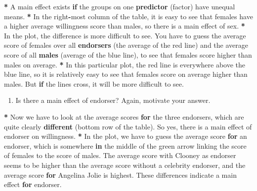 \documentclass[a4paper]{book}
\newenvironment{Shaded}{\begin{snugshade}}{\end{snugshade}}
\newcommand{\KeywordTok}[1]{\textcolor[rgb]{0,0,0}{\textbf{#1}}}
\newcommand{\StringTok}[1]{\textcolor[rgb]{0.00,0.00,0.00}{#1}}
\newcommand{\ControlFlowTok}[1]{\textcolor[rgb]{0.00,0.00,0.00}{\textbf{#1}}}
\newcommand{\OperatorTok}[1]{\textcolor[rgb]{0.00,0.00,0.00}{\textbf{#1}}}
\newcommand{\NormalTok}[1]{#1}
\providecommand{\tightlist}{%
  \setlength{\itemsep}{0pt}\setlength{\parskip}{0pt}}
\theoremstyle{definition}
\theoremstyle{definition}
\theoremstyle{definition}
\theoremstyle{remark}
\begin{document}
\begin{Shaded}
\begin{Highlighting}[]
\OperatorTok{*}\StringTok{ }\NormalTok{A main effect exists }\ControlFlowTok{if}\NormalTok{ the groups on one }\KeywordTok{predictor}\NormalTok{ (factor) have unequal}
\NormalTok{means.}
\OperatorTok{*}\StringTok{ }\NormalTok{In the right}\OperatorTok{-}\NormalTok{most column of the table, it is easy to see that females have a}
\NormalTok{higher average willingness score than males, so there is a main effect of sex.}
\OperatorTok{*}\StringTok{ }\NormalTok{In the plot, the difference is more difficult to see. You have to guess the}
\NormalTok{average score of females over all }\KeywordTok{endorsers}\NormalTok{ (the average of the red line) and}
\NormalTok{the average score of all }\KeywordTok{males}\NormalTok{ (average of the blue line), to see that females}
\NormalTok{score higher than males on average.}
\OperatorTok{*}\StringTok{ }\NormalTok{In this particular plot, the red line is everywhere above the blue line, so}
\NormalTok{it is relatively easy to see that females score on average higher than males.}
\NormalTok{But }\ControlFlowTok{if}\NormalTok{ the lines cross, it will be more difficult to see.}
\end{Highlighting}
\end{Shaded}

\begin{enumerate}
\def\labelenumi{\arabic{enumi}.}
\setcounter{enumi}{1}
\tightlist
\item
  Is there a main effect of endorser? Again, motivate your answer.
\end{enumerate}

\begin{Shaded}
\begin{Highlighting}[]
\OperatorTok{*}\StringTok{ }\NormalTok{Now we have to look at the average scores }\ControlFlowTok{for}\NormalTok{ the three endorsers, which are}
\NormalTok{quite clearly }\KeywordTok{different}\NormalTok{ (bottom row of the table). So yes, there is a main}
\NormalTok{effect of endorser on willingness.}
\OperatorTok{*}\StringTok{ }\NormalTok{In the plot, we have to guess the average score }\ControlFlowTok{for}\NormalTok{ an endorser, which is}
\NormalTok{somewhere }\ControlFlowTok{in}\NormalTok{ the middle of the green arrow linking the score of females to the}
\NormalTok{score of males. The average score with Clooney as endorser seems to be higher}
\NormalTok{than the average score without a celebrity endorser, and the average score }\ControlFlowTok{for}
\NormalTok{Angelina Jolie is highest. These differences indicate a main effect }\ControlFlowTok{for}
\NormalTok{endorser.}
\end{Highlighting}
\end{Shaded}
\end{document}

